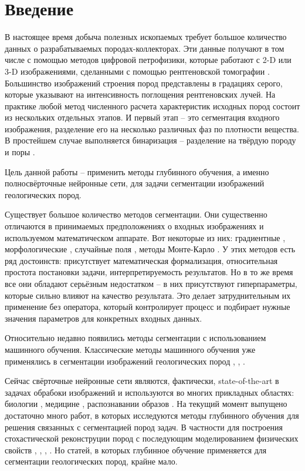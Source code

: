 \documentclass[14pt, a4paper, oneside, bold]{extarticle}
\begin{document}
\newpage

\tableofcontents

\newpage


\section{Введение} \label{intro}

В настоящее время добыча полезных ископаемых требует большое количество 
данных о разрабатываемых породах-коллекторах. Эти данные получают в том числе с помощью методов цифровой петрофизики, которые работают с  
2-D или 3-D изображениями, сделанными с помощью рентгеновской томографии \cite{1}. Большинство изображений строения пород представлены в градациях серого, которые указывают на интенсивность поглощения рентгеновских лучей. На практике любой метод численного расчета характеристик исходных пород состоит из нескольких отдельных этапов. 
И первый этап -- это сегментация входного изображения, разделение его
на несколько различных фаз по плотности вещества. В простейшем случае выполняется бинаризация -- разделение на твёрдую породу и поры \cite{2}. 

Цель данной работы -- применить методы глубинного обучения, а именно полносвёрточные нейронные сети, для задачи сегментации изображений геологических пород.

Существует большое количество методов сегментации. Они существенно отличаются в принимаемых предположениях о входных изображениях и используемом математическом аппарате. Вот некоторые из них: градиентные \cite{13}, морфологические \cite{17}, случайные поля \cite{14}, методы Монте-Карло \cite{16}. У этих методов есть ряд достоинств: присутствует математическая формализация, относительная простота постановки задачи, интерпретируемость результатов. Но в то же время все они обладают серьёзным недостатком -- в них присутствуют гиперпараметры, которые сильно влияют на качество результата. Это делает затруднительным их применение без оператора, который контролирует процесс и подбирает нужные значения параметров для  конкретных входных данных. 

Относительно недавно появились методы сегментации с использованием машинного обучения. Классические методы машинного обучения уже применялись в сегментации изображений геологических пород \cite{3}, \cite{4}, \cite{5}.

Сейчас свёрточные нейронные сети являются, фактически, state-of-the-art в задачах обрабоки изображений и используются во многих прикладных областях: биологии \cite{6}, медицине \cite{18}, распознавании образов \cite{11}. На текущий момент выпущено достаточно много работ, в которых исследуются методы глубинного обучения для решения связанных с сегментацией пород задач. В частности для  построения стохастической реконструции пород с последующим моделированием физических свойств \cite{7}, \cite{8}, \cite{9}, \cite{10}. Но статей, в которых глубинное обучение применяется для сегментации геологических пород, крайне мало. 
\end{document}
